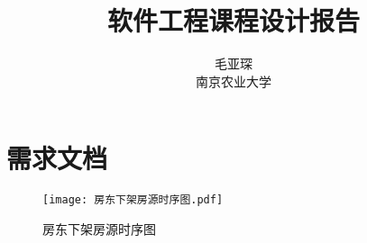 \documentclass[lang=cn,11pt,a4paper,cite=authoryear]{elegantpaper}
\title{软件工程课程设计报告}
\author{毛亚琛 \\ 南京农业大学}
\date{\zhtoday}
\begin{document}
\maketitle



\section{需求文档}

\begin{figure}[]
    \centering
    \texttt{[image: 房东下架房源时序图.pdf]}
    \caption{房东下架房源时序图}
    \label{fig:房东下架房源时序图}
\end{figure}
\end{document}
